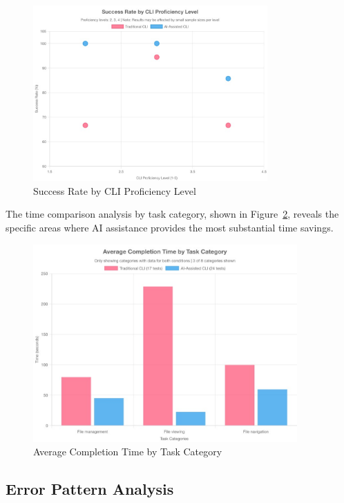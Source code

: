 \begin{figure}[h]
	\centering
	\includegraphics[width=0.8\textwidth]{assets/figures/proficiency_correlation.pdf}
	\caption{Success Rate by CLI Proficiency Level}
	\label{fig:proficiency_correlation}
\end{figure}

The time comparison analysis by task category, shown in Figure~\ref{fig:time_comparison}, reveals the specific areas where AI assistance provides the most substantial time savings.

\begin{figure}[h]
	\centering
	\includegraphics[width=0.9\textwidth]{assets/figures/time_comparison_by_category.pdf}
	\caption{Average Completion Time by Task Category}
	\label{fig:time_comparison}
\end{figure}

\subsection{Error Pattern Analysis}

